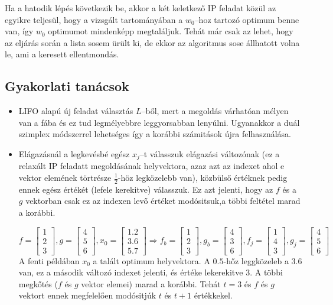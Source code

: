 Ha a hatodik lépés következik be, akkor a két keletkező IP feladat közül az
egyikre teljesül, hogy a vizsgált tartományában a $w_0$--hoz tartozó optimum
benne van, így $w_0$ optimumot mindenképp megtaláljuk. Tehát már csak az lehet,
hogy az eljárás során a lista sosem ürült ki, de ekkor az algoritmus sose
állhatott volna le, ami a keresett ellentmondás.

\subsection{Gyakorlati tanácsok}
\begin{itemize}
  \item LIFO alapú új feladat választás $L$--ből, mert a megoldás várhatóan
  mélyen van a fába és ez tud legmélyebbre leggyorsabban lenyúlni. Ugyanakkor a
  duál szimplex módszerrel lehetséges így a korábbi számitások újra felhasználása.
  \item Elágazásnál a legkevésbé egész $x_j$--t válasszuk elágazási változónak
  (ez a relaxált IP feladatt megoldásának helyvektora, azaz azt az indexet ahol
  e vektor elemének törtrésze $\frac{1}{2}$-höz legközelebb van), közbülső
  értéknek pedig ennek egész értékét (lefele kerekitve) válasszuk. Ez azt
  jelenti, hogy az $f$ és a $g$ vektorban csak ez az indexen levő értéket
  modósitsuk,a többi feltétel marad a korábbi.
  
  \[
  f=\begin{bmatrix}
  1 \\
  2 \\
  3 
  \end{bmatrix},
  g = \begin{bmatrix}
  4 \\
  5 \\
  6 
  \end{bmatrix},
  x_0 = \begin{bmatrix}
  1.2 \\
  3.6 \\
  5.7 
  \end{bmatrix}
  \Rightarrow
  f_b=\begin{bmatrix}
  1 \\
  2 \\
  3 
  \end{bmatrix},
  g_b = \begin{bmatrix}
  4 \\
  3 \\
  6 
  \end{bmatrix},
  f_j=\begin{bmatrix}
  1 \\
  4 \\
  3 
  \end{bmatrix},
  g_j = \begin{bmatrix}
  4 \\
  5 \\
  6 
  \end{bmatrix}
  \] A fenti példában $x_0$ a talált optimum helyvektora. A $0.5$-hőz leggközeleb a
  $3.6$ van, ez a második változó indexet jelenti, és értéke lekerekitve $3$. A
  többi megkőtés ($f$ és $g$ vektor elemei) marad a korábbi. Tehát $t=3$ és $f$ és 
  $g$ vektort ennek megfelelően modósitjúk $t$ és $t+1$ értékkekel. 
\end{itemize}